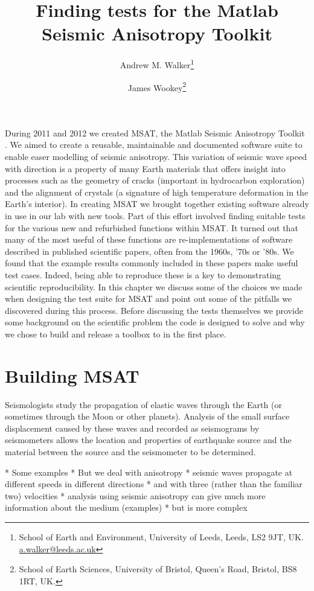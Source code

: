 \documentclass[11pt, oneside]{article}   	%
\title{Finding tests for the Matlab Seismic Anisotropy Toolkit}
\author{Andrew M. Walker\footnote{School of Earth and Environment, 
                   University of Leeds, Leeds, LS2 9JT, UK. \url{a.walker@leeds.ac.uk} }
\and 
             James Wookey\footnote{School of Earth Sciences, 
                    University of Bristol, Queen's Road, Bristol, BS8 1RT, UK.}}
\begin{document}
\maketitle
\linenumbers


During 2011 and 2012 we created MSAT, the Matlab Seismic Anisotropy
Toolkit \cite{Walker2012c}. We aimed to create a reusable, maintainable and documented
software suite to enable easer modelling of seismic anisotropy. This 
variation of seismic wave speed with direction is a property of many 
Earth materials that offers insight into processes such as the geometry
of cracks (important in hydrocarbon exploration) and the alignment
of crystals (a signature of high temperature deformation in the Earth's
interior). In creating MSAT we brought together existing software
already in use in our lab with new tools. Part of this effort involved
finding suitable tests for the various new and refurbished functions 
within MSAT. It turned out that many of the most useful of these 
functions are re-implementations of software described in published
scientific papers, often from the 1960s, '70s or '80s. We found that 
the example results commonly included in these papers make useful test
cases. Indeed, being able to reproduce these is a key to demonstrating 
scientific reproducibility. In this chapter we discuss some of the choices
we made when designing the test suite for MSAT and point out some of
the pitfalls we discovered during this process. Before discussing the 
tests themselves we provide some background on the scientific problem
the code is designed to solve and why we chose to build and release a 
toolbox to in the first place.

\section{Building MSAT}

Seismologists study the propagation of elastic waves through the Earth (or
sometimes through the Moon or other planets). Analysis of the small surface 
displacement caused by these waves and recorded as seismograms by 
seismometers allows the location and properties of earthquake source 
and the material between the source and the seismometer to be determined.

* Some examples
* But we deal with anisotropy
* seismic waves propagate at different speeds in different directions
* and with three (rather than the familiar two) velocities 
* analysis using seismic anisotropy can give much more information 
about the medium (examples)
* but is more complex
\end{document}
